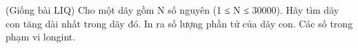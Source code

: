 (Giống bài LIQ) Cho một dãy gồm N số nguyên (1 ≤ N ≤ 30000). Hãy tìm dãy con tăng dài nhất trong dãy đó. In ra số lượng phần tử của dãy con. Các số trong phạm vi longint.